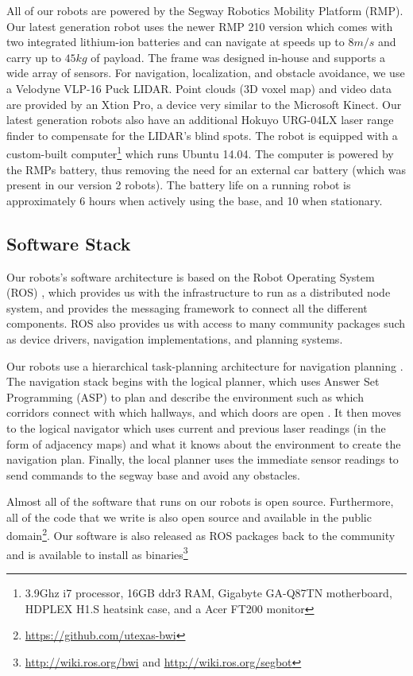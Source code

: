 \documentclass[
  oneside,
  11pt, a4paper,
  footinclude=true,
  headinclude=true,
  cleardoublepage=empty
]{article}
\begin{document}
All of our robots are powered by the Segway Robotics Mobility Platform (RMP).
Our latest generation robot uses the newer RMP 210 version which comes with two
integrated lithium-ion batteries and can navigate at speeds up to $8
m/s$ and carry up to $45 kg$ of payload. The frame was designed in-house
and supports a wide array of sensors. For navigation, localization, and
obstacle avoidance, we use a Velodyne VLP-16 Puck LIDAR. Point clouds (3D voxel
map) and video data are provided by an Xtion Pro, a device very similar to the
Microsoft Kinect. Our latest generation robots also have an additional Hokuyo
URG-04LX laser range finder to compensate for the LIDAR's blind spots. The
robot is equipped with a custom-built computer\footnote{3.9Ghz i7 processor,
16GB ddr3 RAM, Gigabyte GA-Q87TN motherboard, HDPLEX H1.S heatsink case, and a
Acer FT200 monitor} which runs Ubuntu 14.04. The computer is powered by the
RMPs battery, thus removing the need for an external car battery (which was
present in our version 2 robots).  The battery life on a running robot is
approximately 6 hours when actively using the base, and 10 when stationary.

\subsection{Software Stack}

Our robots's software architecture is based on the Robot Operating System (ROS)
\citep{quigley2009}, which provides us with the infrastructure to run as a
distributed node system, and provides the messaging framework to connect all
the different components. ROS also provides us with access to many community
packages such as device drivers, navigation implementations, and planning
systems.

Our robots use a hierarchical task-planning architecture for navigation
planning \citep{zhang2014}. The navigation stack begins with the logical
planner, which uses Answer Set Programming (ASP) to plan and describe the
environment such as which corridors connect with which hallways, and which
doors are open \citep{lifschitz2008}. It then moves to the logical navigator
which uses current and previous laser readings (in the form of adjacency maps)
and what it knows about the environment to create the navigation plan. Finally,
the local planner uses the immediate sensor readings to send commands to the
segway base and avoid any obstacles.

Almost all of the software that runs on our robots is open source. Furthermore,
all of the code that we write is also open source and available in the public
domain\footnote{\url{https://github.com/utexas-bwi}}. Our software is also
released as ROS packages back to the community and is available to install as
binaries\footnote{\url{http://wiki.ros.org/bwi} and
\url{http://wiki.ros.org/segbot}}
\end{document}
